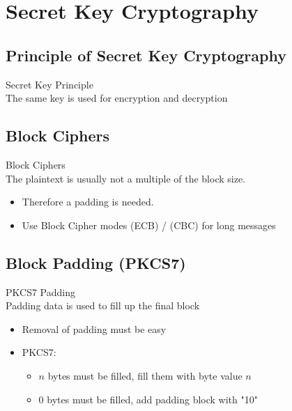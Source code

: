 \section{Secret Key Cryptography}

\subsection{Principle of Secret Key Cryptography}

\begin{concept}{Secret Key Principle}\\
    The same key is used for encryption and decryption
\end{concept}

\subsection{Block Ciphers}

\begin{definition}{Block Ciphers}\\
    The plaintext is usually not a multiple of the block size.
    \begin{itemize}
        \item Therefore a padding is needed.
        \item Use Block Cipher modes (ECB) / (CBC) for long messages
    \end{itemize}
\end{definition}


\subsection{Block Padding (PKCS7)}

\begin{concept}{PKCS7 Padding}\\
    Padding data is used to fill up the final block
    \begin{itemize}
        \item Removal of padding must be easy
        \item PKCS7:
        \begin{itemize}
            \item $n$ bytes must be filled, fill them with byte value $n$
            \item 0 bytes must be filled, add padding block with "10"
        \end{itemize}
    \end{itemize}
\end{concept}

